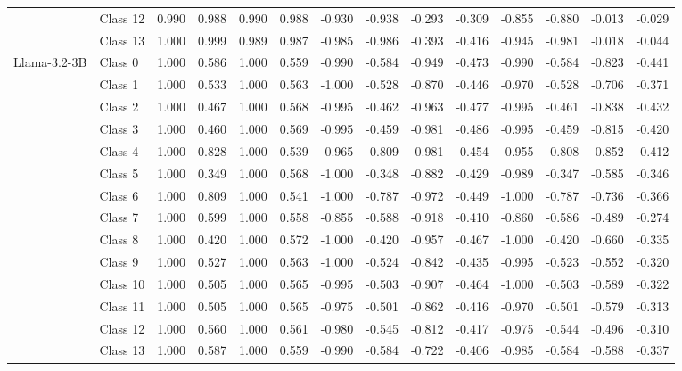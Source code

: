 \begin{table*}[t]
\begin{tabular}{l|l|rrrr|rrrr|rrrr}
&Class 12 & 0.990 & 0.988 & 0.990 & 0.988 & -0.930 & -0.938 & -0.293 & -0.309 & -0.855 & -0.880 & -0.013 & -0.029 \\
&Class 13 & 1.000 & 0.999 & 0.989 & 0.987 & -0.985 & -0.986 & -0.393 & -0.416 & -0.945 & -0.981 & -0.018 & -0.044 \\
\midrule
\multirow{14}{*}{Llama-3.2-3B} 
&Class 0 & 1.000 & 0.586 & 1.000 & 0.559 & -0.990 & -0.584 & -0.949 & -0.473 & -0.990 & -0.584 & -0.823 & -0.441 \\
&Class 1 & 1.000 & 0.533 & 1.000 & 0.563 & -1.000 & -0.528 & -0.870 & -0.446 & -0.970 & -0.528 & -0.706 & -0.371 \\
&Class 2 & 1.000 & 0.467 & 1.000 & 0.568 & -0.995 & -0.462 & -0.963 & -0.477 & -0.995 & -0.461 & -0.838 & -0.432 \\
&Class 3 & 1.000 & 0.460 & 1.000 & 0.569 & -0.995 & -0.459 & -0.981 & -0.486 & -0.995 & -0.459 & -0.815 & -0.420 \\
&Class 4 & 1.000 & 0.828 & 1.000 & 0.539 & -0.965 & -0.809 & -0.981 & -0.454 & -0.955 & -0.808 & -0.852 & -0.412 \\
&Class 5 & 1.000 & 0.349 & 1.000 & 0.568 & -1.000 & -0.348 & -0.882 & -0.429 & -0.989 & -0.347 & -0.585 & -0.346 \\
&Class 6 & 1.000 & 0.809 & 1.000 & 0.541 & -1.000 & -0.787 & -0.972 & -0.449 & -1.000 & -0.787 & -0.736 & -0.366 \\
&Class 7 & 1.000 & 0.599 & 1.000 & 0.558 & -0.855 & -0.588 & -0.918 & -0.410 & -0.860 & -0.586 & -0.489 & -0.274 \\
&Class 8 & 1.000 & 0.420 & 1.000 & 0.572 & -1.000 & -0.420 & -0.957 & -0.467 & -1.000 & -0.420 & -0.660 & -0.335 \\
&Class 9 & 1.000 & 0.527 & 1.000 & 0.563 & -1.000 & -0.524 & -0.842 & -0.435 & -0.995 & -0.523 & -0.552 & -0.320 \\
&Class 10 & 1.000 & 0.505 & 1.000 & 0.565 & -0.995 & -0.503 & -0.907 & -0.464 & -1.000 & -0.503 & -0.589 & -0.322 \\
&Class 11 & 1.000 & 0.505 & 1.000 & 0.565 & -0.975 & -0.501 & -0.862 & -0.416 & -0.970 & -0.501 & -0.579 & -0.313 \\
&Class 12 & 1.000 & 0.560 & 1.000 & 0.561 & -0.980 & -0.545 & -0.812 & -0.417 & -0.975 & -0.544 & -0.496 & -0.310 \\
&Class 13 & 1.000 & 0.587 & 1.000 & 0.559 & -0.990 & -0.584 & -0.722 & -0.406 & -0.985 & -0.584 & -0.588 & -0.337 \\

\bottomrule
\end{tabular}

\label{tab:db_14_on_all}
\end{table*}






